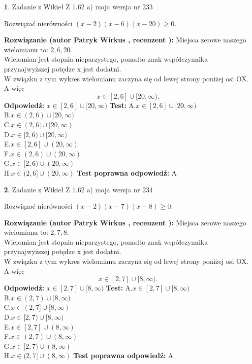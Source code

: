 \documentclass[12pt, a4paper]{article}
\theoremstyle{definition} %
\newtheorem{zad}{}
\newcommand{\zadStart}[1]{\begin{zad}#1\newline}
\newcommand{\zadStop}{\end{zad}}
\newcommand{\rozwStart}[2]{\noindent \textbf{Rozwiązanie (autor #1 , recenzent #2): }\newline}
\newcommand{\rozwStop}{\newline}
\newcommand{\odpStart}{\noindent \textbf{Odpowiedź:}\newline}
\newcommand{\odpStop}{\newline}
\newcommand{\testStart}{\noindent \textbf{Test:}\newline}
\newcommand{\testStop}{\newline}
\newcommand{\kluczStart}{\noindent \textbf{Test poprawna odpowiedź:}\newline}
\newcommand{\kluczStop}{\newline}
\begin{document}
\zadStart{Zadanie z Wikieł Z 1.62 a) moja wersja nr 233}

Rozwiązać nierówności $(x-2)(x-6)(x-20)\ge0$.
\zadStop
\rozwStart{Patryk Wirkus}{}
Miejsca zerowe naszego wielomianu to: $2, 6, 20$.\\
Wielomian jest stopnia nieparzystego, ponadto znak współczynnika przy\linebreak najwyższej potędze x jest dodatni.\\ W związku z tym wykres wielomianu zaczyna się od lewej strony poniżej osi OX. A więc $$x \in [2,6] \cup [20,\infty).$$
\rozwStop
\odpStart
$x \in [2,6] \cup [20,\infty)$
\odpStop
\testStart
A.$x \in [2,6] \cup [20,\infty)$\\
B.$x \in (2,6) \cup [20,\infty)$\\
C.$x \in (2,6] \cup [20,\infty)$\\
D.$x \in [2,6) \cup [20,\infty)$\\
E.$x \in [2,6] \cup (20,\infty)$\\
F.$x \in (2,6) \cup (20,\infty)$\\
G.$x \in [2,6) \cup (20,\infty)$\\
H.$x \in (2,6] \cup (20,\infty)$
\testStop
\kluczStart
A
\kluczStop



\zadStart{Zadanie z Wikieł Z 1.62 a) moja wersja nr 234}

Rozwiązać nierówności $(x-2)(x-7)(x-8)\ge0$.
\zadStop
\rozwStart{Patryk Wirkus}{}
Miejsca zerowe naszego wielomianu to: $2, 7, 8$.\\
Wielomian jest stopnia nieparzystego, ponadto znak współczynnika przy\linebreak najwyższej potędze x jest dodatni.\\ W związku z tym wykres wielomianu zaczyna się od lewej strony poniżej osi OX. A więc $$x \in [2,7] \cup [8,\infty).$$
\rozwStop
\odpStart
$x \in [2,7] \cup [8,\infty)$
\odpStop
\testStart
A.$x \in [2,7] \cup [8,\infty)$\\
B.$x \in (2,7) \cup [8,\infty)$\\
C.$x \in (2,7] \cup [8,\infty)$\\
D.$x \in [2,7) \cup [8,\infty)$\\
E.$x \in [2,7] \cup (8,\infty)$\\
F.$x \in (2,7) \cup (8,\infty)$\\
G.$x \in [2,7) \cup (8,\infty)$\\
H.$x \in (2,7] \cup (8,\infty)$
\testStop
\kluczStart
A
\kluczStop
\end{document}
